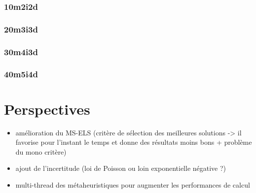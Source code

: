             \subsubsection{10m2i2d}
                
                
                
            \subsubsection{20m3i3d}
                
                
                
            \subsubsection{30m4i3d}
                
                
                
            \subsubsection{40m5i4d}
                
                
                


    \section{Perspectives}
    
    	\begin{itemize}
    		\item amélioration du MS-ELS (critère de sélection des meilleures solutions -> il favorise pour l'instant le temps et donne des résultats moins bons + problème du mono critère)
    		\item ajout de l'incertitude (loi de Poisson ou loin exponentielle négative ?)
    		\item multi-thread des métaheuristiques pour augmenter les performances de calcul
    	\end{itemize}
    		
